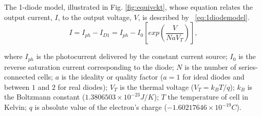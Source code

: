 \documentclass[review]{elsarticle}
\begin{document}
The 1-diode model, illustrated in Fig. \ref{fig:equivckt}, whose equation relates the output current, $I$, to the output voltage, $V$, is described by ~\eqref{eq:1diodemodel}. %
\begin{equation}
\label{eq:1diodemodel}
I = I_{ph}-I_{D1}=I_{ph}-I_{0}\left[ exp \left( \dfrac{V}{NaV_{T}} \right)  \right], 
\end{equation}

\noindent where $I_{ph}$ is the photocurrent delivered by the constant current source; $I_{0}$ is the reverse saturation current corresponding to the diode; $N$ is the number of series-connected cells; %
$a$ is the ideality or quality factor ($a=1$ for ideal diodes and between $1$ and $2$ for real diodes); $V_{T}$ is the thermal voltage ($ V_{T}=k_{B}T/q $); $ k_{B} $ is the Boltzmann constant ($ 1.3806503\times10^{-23}J/K $); $T$ the temperature of cell in Kelvin; $q$ is absolute value of the electron's charge ($ -1.60217646\times10^{-19}C $).
\end{document}

